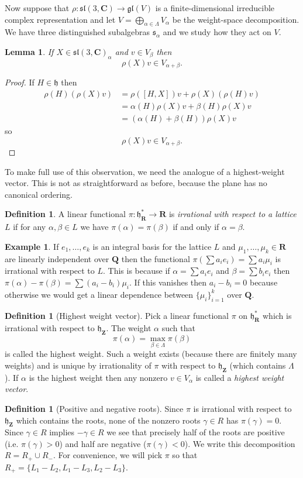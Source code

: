 \documentclass[12pt]{article}
\newcommand{\CC}{\mathbf{C}}
\newcommand{\RR}{\mathbf{R}}
\newcommand{\QQ}{\mathbf{Q}}
\newcommand{\ZZ}{\mathbf{Z}}
\newtheorem{lma}[thm]{Lemma}
\theoremstyle{definition}
\newtheorem{dfn}[thm]{Definition}
\newtheorem{exm}[thm]{Example}
\theoremstyle{check}
\theoremstyle{remark}
\theoremstyle{TheoremNum}
\begin{document}
Now suppose that $\rho\colon\mathfrak{sl}(3,\CC)\to\mathfrak{gl}(V)$ is a finite-dimensional irreducible complex representation and let $V=\bigoplus_{\alpha\in\Lambda}V_{\alpha}$ be the weight-space decomposition. We have three distinguished subalgebras $\mathfrak{s}_{\alpha}$ and we study how they act on $V$.

\begin{lma}\label{lma-shifting}
If $X\in\mathfrak{sl}(3,\CC)_{\alpha}$ and $v\in V_{\beta}$ then
\[\rho(X)v\in V_{\alpha+\beta}.\]
\end{lma}
\begin{proof}
If $H\in\mathfrak{h}$ then
\begin{align*}
\rho(H)(\rho(X)v)&=\rho([H,X])v+\rho(X)(\rho(H)v)\\
&=\alpha(H)\rho(X)v+\beta(H)\rho(X)v\\
&=(\alpha(H)+\beta(H))\rho(X)v
\end{align*}
so
\[\rho(X)v\in V_{\alpha+\beta}.\]
\end{proof}

To make full use of this observation, we need the analogue of a highest-weight vector. This is not as straightforward as before, because the plane has no canonical ordering.
\begin{dfn}
A linear functional $\pi\colon\mathfrak{h}^*_{\RR}\to\RR$ is {\em irrational with respect to a lattice} $L$ if for any $\alpha,\beta\in L$ we have $\pi(\alpha)=\pi(\beta)$ if and only if $\alpha=\beta$.
\end{dfn}
\begin{exm}
If $e_1,\ldots,e_k$ is an integral basis for the lattice $L$ and $\mu_1,\ldots,\mu_k\in\RR$ are linearly independent over $\QQ$ then the functional $\pi(\sum a_ie_i)=\sum a_i\mu_i$ is irrational with respect to $L$. This is because if $\alpha=\sum a_ie_i$ and $\beta=\sum b_ie_i$ then $\pi(\alpha)-\pi(\beta)=\sum(a_i-b_i)\mu_i$. If this vanishes then $a_i-b_i=0$ because otherwise we would get a linear dependence between $\{\mu_i\}_{i=1}^k$ over $\QQ$.
\end{exm}
\begin{dfn}[Highest weight vector]
Pick a linear functional $\pi$ on $\mathfrak{h}^*_{\RR}$ which is irrational with respect to $\mathfrak{h}_{\ZZ}$. The weight $\alpha$ such that
\[\pi(\alpha)=\max_{\beta\in\Lambda}\pi(\beta)\]
is called the highest weight. Such a weight exists (because there are finitely many weights) and is unique by irrationality of $\pi$ with respect to $\mathfrak{h}_{\ZZ}$ (which contains $\Lambda$). If $\alpha$ is the highest weight then any nonzero $v\in V_{\alpha}$ is called a {\em highest weight vector}.
\end{dfn}
\begin{dfn}[Positive and negative roots]
Since $\pi$ is irrational with respect to $\mathfrak{h}_{\ZZ}$ which contains the roots, none of the nonzero roots $\gamma\in R$ has $\pi(\gamma)=0$. Since $\gamma\in R$ implies $-\gamma\in R$ we see that precisely half of the roots are positive (i.e. $\pi(\gamma)>0$) and half are negative ($\pi(\gamma)<0$). We write this decomposition $R=R_+\cup R_-$. For convenience, we will pick $\pi$ so that $R_+=\{L_1-L_2,L_1-L_3,L_2-L_3\}$.
\end{dfn}
\end{document}
